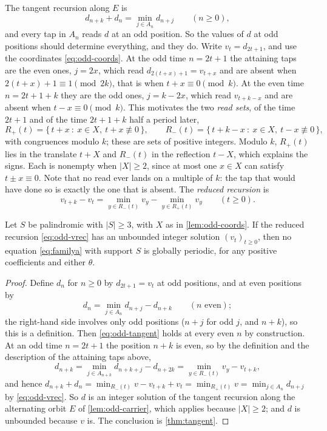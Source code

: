 The tangent recursion along $E$ is
\begin{equation}
d_{n+k}+d_n=\min_{j\in A_n} d_{n+j}\qquad(n\ge0),
\label{eq:odd-tangent}
\end{equation}
and every tap in $A_n$ reads $d$ at an odd position. So the values of $d$ at
odd positions should determine everything, and they do. Write
$v_t=d_{2t+1}$, and use the coordinates \eqref{eq:odd-coords}. At the odd
time $n=2t+1$ the attaining taps are the even ones, $j=2x$, which read
$d_{2(t+x)+1}=v_{t+x}$ and are absent when $2(t+x)+1\equiv1\pmod{2k}$, that
is when $t+x\equiv0\pmod k$. At the even time $n=2t+1+k$ they are the odd
ones, $j=k-2x$, which read $v_{t+k-x}$ and are absent when $t-x\equiv0\pmod
k$. This motivates the two \emph{read sets}, of the time $2t+1$ and of the
time $2t+1+k$ half a period later,
\begin{equation}
R_+(t)=\{\,t+x\ :\ x\in X,\ t+x\not\equiv0\,\},
\qquad
R_-(t)=\{\,t+k-x\ :\ x\in X,\ t-x\not\equiv0\,\},
\label{eq:odd-reads}
\end{equation}
with congruences modulo $k$; these are sets of positive integers. Modulo $k$,
$R_+(t)$ lies in the translate $t+X$ and $R_-(t)$ in the reflection $t-X$,
which explains the signs. Each is nonempty when $|X|\ge2$,
since at most one $x\in X$ can satisfy $t\pm x\equiv0$. Note that no read
ever lands on a multiple of $k$: the tap that would have done so is exactly
the one that is absent. The \emph{reduced recursion} is
\begin{equation}
v_{t+k}-v_t=\min_{y\in R_-(t)}v_y-\min_{y\in R_+(t)}v_y\qquad(t\ge0).
\label{eq:odd-vrec}
\end{equation}

\begin{proposition}
\label{prop:odd-second}
Let $S$ be palindromic with $|S|\ge3$, with $X$ as in \autoref{lem:odd-coords}.
If the reduced recursion \eqref{eq:odd-vrec} has an unbounded integer
solution $(v_t)_{t\ge0}$, then no equation \eqref{eq:familya} with support
$S$ is globally periodic, for any positive coefficients and either $\theta$.
\end{proposition}

\begin{proof}
Define $d_n$ for $n\ge0$ by $d_{2t+1}=v_t$ at odd positions, and at even
positions by
\[
d_n=\min_{j\in A_n}d_{n+j}-d_{n+k}\qquad(n\text{ even});
\]
the right-hand side involves only odd positions ($n+j$ for odd $j$, and
$n+k$), so this is a definition. Then \eqref{eq:odd-tangent} holds at every
even $n$ by construction. At an odd time $n=2t+1$ the position $n+k$ is even,
so by the definition and the description of the attaining taps above,
\[
d_{n+k}=\min_{j\in A_{n+k}}d_{n+k+j}-d_{n+2k}=\min_{y\in R_-(t)}v_y-v_{t+k},
\]
and hence
$d_{n+k}+d_n=\min_{R_-(t)}v-v_{t+k}+v_t=\min_{R_+(t)}v
=\min_{j\in A_n}d_{n+j}$ by \eqref{eq:odd-vrec}. So $d$ is an integer
solution of the tangent recursion along the alternating orbit $E$ of
\autoref{lem:odd-carrier}, which applies because $|X|\ge2$; and $d$ is
unbounded because $v$ is. The conclusion is \autoref{thm:tangent}.
\end{proof}

